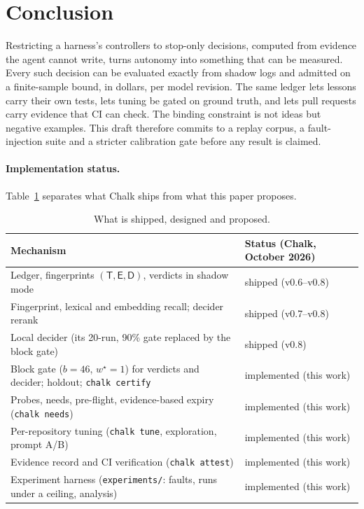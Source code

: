 \documentclass[11pt]{article}
\theoremstyle{remark}
\newcommand{\Tset}{\mathsf{T}}
\newcommand{\Eerr}{\mathsf{E}}
\newcommand{\Dtree}{\mathsf{D}}
\begin{document}
\section{Conclusion}

Restricting a harness's controllers to stop-only decisions, computed from evidence the agent cannot write, turns autonomy into something that can be measured. Every such decision can be evaluated exactly from shadow logs and admitted on a finite-sample bound, in dollars, per model revision. The same ledger lets lessons carry their own tests, lets tuning be gated on ground truth, and lets pull requests carry evidence that CI can check. The binding constraint is not ideas but negative examples. This draft therefore commits to a replay corpus, a fault-injection suite and a stricter calibration gate before any result is claimed.

\paragraph{Implementation status.}
Table~\ref{tab:status} separates what Chalk ships from what this paper proposes.

\begin{table}[ht]
\centering\small
\begin{tabularx}{\linewidth}{@{}Xl@{}}
\toprule
Mechanism & Status (Chalk, October 2026) \\
\midrule
Ledger, fingerprints $(\Tset,\Eerr,\Dtree)$, verdicts in shadow mode & shipped (v0.6--v0.8) \\
Fingerprint, lexical and embedding recall; decider rerank & shipped (v0.7--v0.8) \\
Local decider (its 20-run, 90\% gate replaced by the block gate) & shipped (v0.8) \\
Block gate ($b=46$, $w^\star=1$) for verdicts and decider; holdout; \texttt{chalk certify} & implemented (this work) \\
Probes, needs, pre-flight, evidence-based expiry (\texttt{chalk needs}) & implemented (this work) \\
Per-repository tuning (\texttt{chalk tune}, exploration, prompt A/B) & implemented (this work) \\
Evidence record and CI verification (\texttt{chalk attest}) & implemented (this work) \\
Experiment harness (\texttt{experiments/}: faults, runs under a ceiling, analysis) & implemented (this work) \\
\bottomrule
\end{tabularx}
\caption{What is shipped, designed and proposed.}
\label{tab:status}
\end{table}
\end{document}
